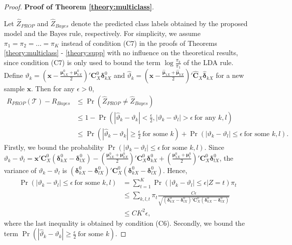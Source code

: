 \documentclass[12pt]{article}
\begin{document}
\begin{proof}{\textbf{Proof of Theorem \ref{theory:multiclass}}.}{}

Let $\hat{Z}_{PROP}$ and $\hat{Z}_{Bayes}$ denote the predicted class labels obtained by the proposed model and the Bayes rule, respectively.
For simplicity, we assume $\pi_1 = \pi_2 = \ldots = \pi_K$ instead of condition (C7) in the proofs of Theorems \ref{theory:multiclass} - \ref{theory:supp} with no influence on the theoretical results, since condition (C7) is only used to bound the term $\log \frac{\pi_k}{\pi_1}$ of the LDA rule.
Define $\vartheta_k = (\bm x - \frac{\bm \mu_{1X}^0 + \bm \mu_{kX}^0}{2})' \bm C_X^0 \bm \delta_{kX}^0$ and $\hat{\vartheta}_k = (\bm x - \frac{\hat{\bm \mu}_{1X} + \hat{\bm \mu}_{kX}}{2})' \hat{\bm C}_X \hat{\bm \delta}_{kX}$ for a new sample $\bm x$.
Then for any $\epsilon > 0$,
\begin{align*}
R_{PROP}(\mathcal{T}) - R_{Bayes} &\leq \Pr(\hat{Z}_{PROP} \neq \hat{Z}_{Bayes})   \\
&\leq 1 - \Pr(|\hat{\vartheta}_k - \vartheta_k| < \frac{\epsilon}{2}, |\vartheta_k - \vartheta_l| > \epsilon~ \mbox{for any } k, l)        \\
&\leq \Pr(|\hat{\vartheta}_k - \vartheta_k| \geq \frac{\epsilon}{2}~ \mbox{for some } k) + \Pr(|\vartheta_k - \vartheta_l| \leq \epsilon~ \mbox{for some } k, l).
\end{align*}
Firstly, we bound the probability $\Pr(|\vartheta_k - \vartheta_l| \leq \epsilon~ \mbox{for some } k, l)$.
Since $\vartheta_k - \vartheta_l = \bm x' \bm C_X^0 (\bm \delta_{kX}^0 - \bm \delta_{lX}^0) - (\frac{\bm \mu_{1X}^0 + \bm \mu_{kX}^0}{2})' \bm C_X^0 \bm \delta_{kX}^0 + (\frac{\bm \mu_{1X}^0 + \bm \mu_l^0}{2})' \bm C_X^0 \bm \delta_{lX}^0$, the variance of $\vartheta_k - \vartheta_l$ is $(\bm \delta_{kX}^0 - \bm \delta_{lX}^0)' \bm C_X^0 (\bm \delta_{kX}^0 - \bm \delta_{lX}^0)$.
Hence,
\begin{align*}
\Pr(|\vartheta_k - \vartheta_l| \leq \epsilon~ \mbox{for some } k, l) &= \sum_{t=1}^K \Pr(|\vartheta_k - \vartheta_l| \leq \epsilon | Z = t) \pi_t  \\
&\leq \sum_{k,l,t} \pi_t \frac{C \epsilon}{\sqrt{(\bm \delta_{kX}^0 - \bm \delta_{lX}^0)' \bm C_X^0 (\bm \delta_{kX}^0 - \bm \delta_{lX}^0)}}  \\
&\leq C K^2 \epsilon,
\end{align*}
where the last inequality is obtained by condition (C6).
Secondly, we bound the term $\Pr(|\hat{\vartheta}_k - \vartheta_k| \geq \frac{\epsilon}{2}~ \mbox{for some } k)$.

\end{proof}
\end{document}
